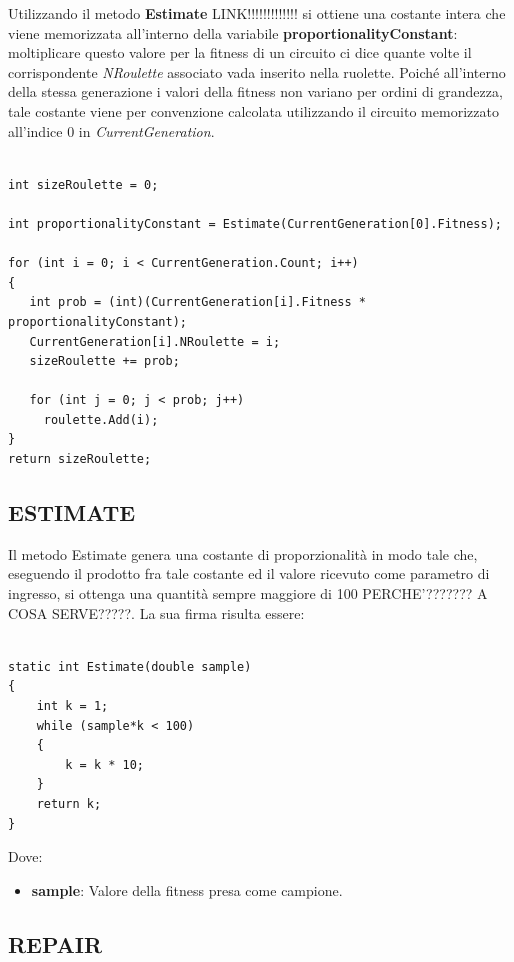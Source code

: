 \documentclass[11pt]{article}
\begin{document}
Utilizzando il metodo \textbf{Estimate} LINK!!!!!!!!!!!!! si ottiene una costante intera che viene memorizzata all'interno della variabile \textbf{proportionalityConstant}: moltiplicare questo valore per la fitness di un circuito ci dice quante volte il corrispondente \textit{NRoulette} associato vada inserito nella ruolette. Poiché all'interno della stessa generazione i valori della fitness non variano per ordini di grandezza, tale costante viene per convenzione calcolata utilizzando il circuito memorizzato all'indice $0$ in \textit{CurrentGeneration}.
\begin{lstlisting}

int sizeRoulette = 0;
            
int proportionalityConstant = Estimate(CurrentGeneration[0].Fitness);

for (int i = 0; i < CurrentGeneration.Count; i++)
{
   int prob = (int)(CurrentGeneration[i].Fitness * proportionalityConstant);
   CurrentGeneration[i].NRoulette = i;
   sizeRoulette += prob;
   
   for (int j = 0; j < prob; j++)
     roulette.Add(i);
}
return sizeRoulette;

\end{lstlisting}

\subsection*{ESTIMATE}

Il metodo Estimate genera una costante di proporzionalità in modo tale che, eseguendo il prodotto fra tale costante ed il valore ricevuto come parametro di ingresso, si ottenga una quantità sempre maggiore di 100 PERCHE'??????? A COSA SERVE?????. La sua firma risulta essere:

\begin{lstlisting}

static int Estimate(double sample)
{
    int k = 1;
    while (sample*k < 100)
    {
        k = k * 10;
    }
    return k;
}

\end{lstlisting}

Dove:

\begin{itemize}
    \item \textbf{sample}: Valore della fitness presa come campione.
\end{itemize}

\subsection*{REPAIR}
\end{document}
